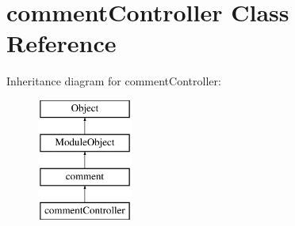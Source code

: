 \hypertarget{classcommentController}{\section{comment\-Controller Class Reference}
\label{classcommentController}
}
Inheritance diagram for comment\-Controller\-:\begin{figure}[H]
\begin{center}
\leavevmode
\includegraphics[height=4.000000cm]{classcommentController}
\end{center}
\end{figure}
